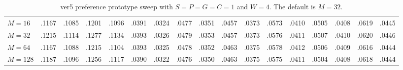 \documentclass[11pt]{article}
\begin{document}
\begin{table}[!t]
{\begin{tabular}{l*{4}{rrrr}}
$M=16$ & .1167 & .1085 & .1201 & .1096 & .0391 & .0324 & .0477 & .0351 & .0457 & .0373 & .0573 & .0410 & .0505 & .0408 & .0619 & .0445 \\
$M=32$ & .1215 & .1114 & .1277 & .1134 & .0393 & .0326 & .0479 & .0353 & .0457 & .0373 & .0576 & .0411 & .0507 & .0410 & .0620 & .0446 \\
$M=64$ & .1167 & .1088 & .1215 & .1104 & .0393 & .0325 & .0478 & .0352 & .0463 & .0375 & .0578 & .0412 & .0506 & .0409 & .0616 & .0444 \\
$M=128$ & .1187 & .1096 & .1256 & .1117 & .0390 & .0322 & .0476 & .0350 & .0463 & .0375 & .0575 & .0411 & .0504 & .0408 & .0618 & .0444 \\
\bottomrule
\end{tabular}%
}
\caption{ver5 preference prototype sweep with $S=P=G=C=1$ and $W=4$. The default is $M=32$.}
\label{tab:prefsweep}
\end{table}
\end{document}
